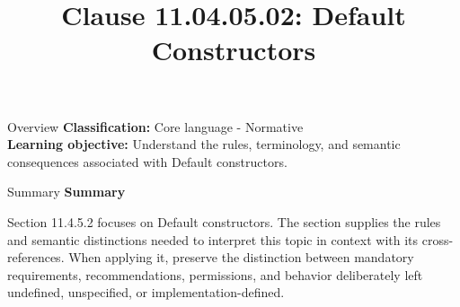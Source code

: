 \documentclass[10pt,letterpaper]{article}
\title{Clause 11.04.05.02: Default Constructors}
\author{}
\date{}
\begin{document}
\maketitle
\begin{CornellOverviewBox}{Overview}
\textbf{Classification:} Core language - Normative\\[2pt]
\textbf{Learning objective:} Understand the rules, terminology, and semantic consequences associated with Default constructors.
\end{CornellOverviewBox}\begin{CornellSummaryBox}{Summary}
{\sffamily\bfseries\color{Accent} Summary}\par\vspace{3pt}Section 11.4.5.2 focuses on Default constructors. The section supplies the rules and semantic distinctions needed to interpret this topic in context with its cross-references. When applying it, preserve the distinction between mandatory requirements, recommendations, permissions, and behavior deliberately left undefined, unspecified, or implementation-defined.
\end{CornellSummaryBox}
\end{document}
